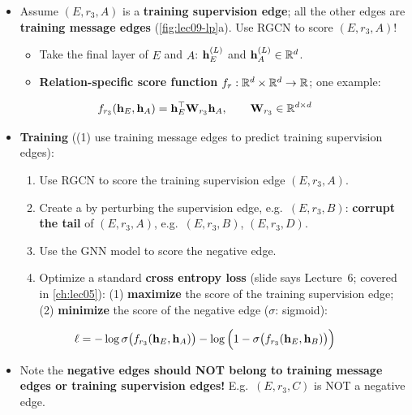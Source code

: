 \begin{itemize}
  \item Assume $(E,r_3,A)$ is a \textbf{training supervision edge}; all the other
    edges are \textbf{training message edges} (\cref{fig:lec09-lp}a). Use RGCN
    to score $(E,r_3,A)$!
    \begin{itemize}
      \item Take the final layer of $E$ and $A$: $\mathbf{h}_E^{(L)}$ and
        $\mathbf{h}_A^{(L)}\in\mathbb{R}^d$.
      \item \textbf{Relation-specific score function}
        $f_r:\mathbb{R}^d\times\mathbb{R}^d\to\mathbb{R}$; one example:
    \end{itemize}
\end{itemize}
\begin{equation}\label{eq:lec09-score}
  f_{r_3}(\mathbf{h}_E,\mathbf{h}_A) = \mathbf{h}_E^{\top}\mathbf{W}_{r_3}\mathbf{h}_A,\qquad \mathbf{W}_{r_3}\in\mathbb{R}^{d\times d}
\end{equation}
\begin{itemize}
  \item \textbf{Training} ((1) use training message edges to predict training
    supervision edges):
    \begin{enumerate}[label=\arabic*.]
      \item Use RGCN to score the training supervision edge $(E,r_3,A)$.
      \item Create a  by perturbing the supervision edge, e.g.\
        $(E,r_3,B)$: \textbf{corrupt the tail} of $(E,r_3,A)$, e.g.\
        $(E,r_3,B)$, $(E,r_3,D)$.
      \item Use the GNN model to score the negative edge.
      \item Optimize a standard \textbf{cross entropy loss} (slide says
        Lecture~6; covered in \cref{ch:lec05}):
        (1) \textbf{maximize} the score of the training supervision edge; (2)
        \textbf{minimize} the score of the negative edge ($\sigma$: sigmoid):
    \end{enumerate}
\end{itemize}
\begin{equation}\label{eq:lec09-loss}
  \ell = -\log\sigma\big(f_{r_3}(\mathbf{h}_E,\mathbf{h}_A)\big)
         - \log\Big(1-\sigma\big(f_{r_3}(\mathbf{h}_E,\mathbf{h}_B)\big)\Big)
\end{equation}
\begin{itemize}
  \item Note the \textbf{negative edges should NOT belong to training message
    edges or training supervision edges!} E.g.\ $(E,r_3,C)$ is NOT a negative
    edge.
\end{itemize}

